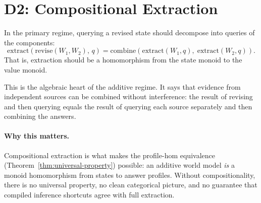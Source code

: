\documentclass[11pt,openany]{report}
\begin{document}


\section{D2: Compositional Extraction}
\label{sec:d2}

\begin{definition}
\label{def:d2}
In the primary regime, querying a revised state should decompose into
queries of the components:
\[
  \mathrm{extract}(\mathrm{revise}(W_1, W_2),\, q)
  = \mathrm{combine}(\mathrm{extract}(W_1, q),\;
                       \mathrm{extract}(W_2, q)).
\]
That is, extraction should be a homomorphism from the state monoid to
the value monoid.
\end{definition}

\noindent
This is the algebraic heart of the additive regime.  It says that
evidence from independent sources can be combined without interference:
the result of revising and then querying equals the result of querying
each source separately and then combining the answers.

\paragraph{Why this matters.}
Compositional extraction is what makes the profile-hom equivalence
(Theorem~\ref{thm:universal-property}) possible: an additive world
model \emph{is} a monoid homomorphism from states to answer profiles.
Without compositionality, there is no universal property, no clean
categorical picture, and no guarantee that compiled inference shortcuts
agree with full extraction.
\end{document}
